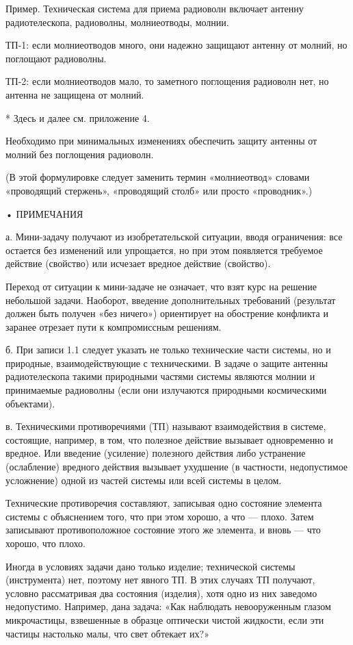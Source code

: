 Пример.  Техническая система  для  приема  радиоволн включает  антенну
радиотелескопа, радиоволны, молниеотводы, молнии.

ТП-1:  если  молниеотводов  много,  они надежно  защищают  антенну  от
молний, но поглощают радиоволны.

ТП-2: если молниеотводов мало,  то заметного поглощения радиоволн нет,
но антенна не защищена от молний.

* Здесь и далее см. приложение 4.


Необходимо  при минимальных  изменениях обеспечить  защиту антенны  от
молний без поглощения радиоволн.

(В  этой формулировке  следует заменить  термин «молниеотвод»  словами
«проводящий стержень», «проводящий столб» или просто «проводник».)

• ПРИМЕЧАНИЯ

а.   Мини-задачу   получают   из  изобретательской   ситуации,   вводя
ограничения: все  остается без изменений  или упрощается, но  при этом
появляется требуемое действие (свойство) или исчезает вредное действие
(свойство).

Переход  от ситуации  к  мини-задаче  не означает,  что  взят курс  на
решение небольшой задачи. Наоборот, введение дополнительных требований
(результат должен быть получен «без ничего») ориентирует на обострение
конфликта и заранее отрезает пути к компромиссным решениям.

б. При записи 1.1 следует указать не только технические части системы,
но и  природные, взаимодействующие с  техническими. В задаче  о защите
антенны  радиотелескопа  такими  природными частями  системы  являются
молнии  и  принимаемые  радиоволны  (если  они  излучаются  природными
космическими объектами).

в.   Техническими  противоречиями   (ТП)  называют   взаимодействия  в
системе, состоящие,  например, в  том, что полезное  действие вызывает
одновременно  и вредное.  Или введение  (усиление) полезного  действия
либо устранение  (ослабление) вредного действия вызывает  ухудшение (в
частности, недопустимое  усложнение) одной из частей  системы или всей
системы в целом.

Технические противоречия составляют, записывая одно состояние элемента
системы с объяснением того, что при  этом хорошо, а что — плохо. Затем
записывают противоположное состояние этого же  элемента, и вновь — что
хорошо, что плохо.

Иногда  в условиях  задачи  дано только  изделие; технической  системы
(инструмента)  нет,  поэтому   нет  явного  ТП.  В   этих  случаях  ТП
получают, условно  рассматривая два состояния (изделия),  хотя одно из
них  заведомо  недопустимо.  Например,  дана  задача:  «Как  наблюдать
невооруженным  глазом  микрочастицы,  взвешенные в  образце  оптически
чистой жидкости,  если эти частицы  настолько малы, что  свет обтекает
их?»

